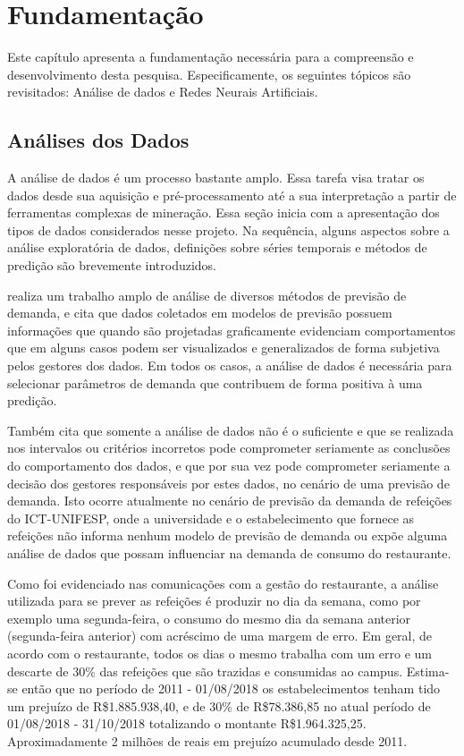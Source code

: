   \chapter{Fundamentação} \label{cap:teoria}
  
Este capítulo apresenta a fundamentação necessária para a compreensão e desenvolvimento desta pesquisa. Especificamente, os seguintes tópicos são revisitados: Análise de dados e Redes Neurais Artificiais.
 
\section{Análises dos Dados}

A análise de dados é um processo bastante amplo. Essa tarefa visa tratar os dados desde sua aquisição e pré-processamento até a sua interpretação a partir de ferramentas complexas de mineração. Essa seção inicia com a apresentação dos tipos de dados considerados nesse projeto. Na sequência, alguns aspectos sobre a análise exploratória de dados, definições sobre séries temporais e métodos de predição são brevemente introduzidos.

\cite{Junior2007} realiza um trabalho amplo de análise de diversos métodos de previsão de demanda, e cita que dados coletados em modelos de previsão possuem informações que quando são projetadas graficamente evidenciam comportamentos que em alguns casos podem ser visualizados e generalizados de forma subjetiva pelos gestores dos dados. Em todos os casos, a análise de dados é necessária para selecionar parâmetros de demanda que contribuem de forma positiva à uma predição.

Também cita que somente a análise de dados não é o suficiente e que se realizada nos intervalos ou critérios incorretos pode comprometer seriamente as conclusões do comportamento dos dados, e que por sua vez pode comprometer seriamente a decisão dos gestores responsáveis por estes dados, no cenário de uma previsão de demanda.  Isto ocorre atualmente no cenário de previsão da demanda de refeições do ICT-UNIFESP, onde a universidade e o estabelecimento que fornece as refeições não informa nenhum modelo de previsão de demanda ou expõe alguma análise de dados que possam influenciar na demanda de consumo do restaurante. 

Como foi evidenciado nas comunicações com a gestão do restaurante, a análise utilizada para se prever as refeições é produzir no dia da semana, como por exemplo uma segunda-feira, o consumo do mesmo dia da semana anterior (segunda-feira anterior) com acréscimo de uma margem de erro. Em geral, de acordo com o restaurante, todos os dias o mesmo trabalha com um erro e um descarte de 30\% das refeições que são trazidas e consumidas ao campus. Estima-se então que no período de 2011 - 01/08/2018 os estabelecimentos tenham tido um prejuízo de R\$1.885.938,40, e de 30\% de R\$78.386,85 no atual período de 01/08/2018 - 31/10/2018 totalizando o montante  R\$1.964.325,25. Aproximadamente 2 milhões de reais em prejuízo acumulado desde 2011.


